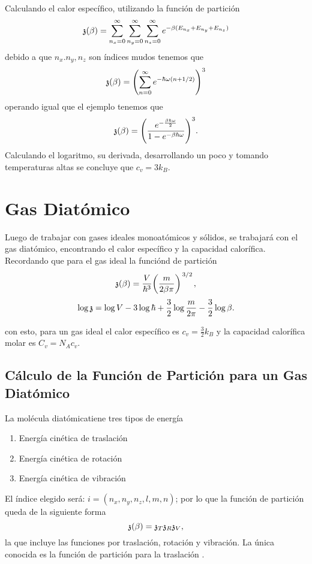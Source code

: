 Calculando el calor específico, utilizando la función de partición 
    $$ \mathfrak{z} (\beta) = \sum _{n_x = 0} ^\infty \sum _{n_y = 0} ^\infty \sum _{n_z = 0} ^\infty e^{-\beta (E_{n_x} + E_{n_y} + E_{n_z})} $$
debido a que $n_x. n_y, n_z$ son índices mudos tenemos que
    $$ \mathfrak{z} (\beta) = \qty(\sum _{n=0} ^\infty e^{-\hbar \omega (n + 1/2)})^3  $$
operando igual que el ejemplo tenemos que
    $$ \mathfrak{z} (\beta) = \qty(\frac{e^{-\frac{\beta \hbar \omega}{2}}}{1 - e^{-\beta \hbar \omega}})^3 . $$
Calculando el logaritmo, su derivada, desarrollando un poco y tomando temperaturas altas se concluye que $ c_v = 3k_B$.

\chapter{Gas Diatómico}
Luego de trabajar con gases ideales monoatómicos y sólidos, se trabajará con el gas diatómico, encontrando el calor específico y la capacidad calorífica. Recordando que para el gas ideal la funciónd de partición
	$$ \partition (\beta) = \frac{V}{\hbar ^3} \qty(\frac{m}{2\beta \pi})^{\flatfrac{3}{2}}, $$
	$$ \log{\mathfrak{z}} = \log{V} - 3\log{\hbar} + \frac{3}{2}\log{\frac{m}{2\pi} - \frac{3}{2} \log{\beta}}. $$

con esto, para un gas ideal el calor específico es $c_v = \frac{3}{2} k_B$ y la capacidad calorífica molar es $C_v = N_A c_v$.

\section{Cálculo de la Función de Partición para un Gas Diatómico}
La molécula diatómicatiene tres tipos de energía
\begin{enumerate}
	\item Energía cinética de traslación
	\item Energía cinética de rotación
	\item Energía cinética de vibración
\end{enumerate}

El índice elegido será: $i = (n_x,n_y,n_z,l,m,n)$; por lo que la función de partición queda de la siguiente forma
	$$ \mathfrak{z} (\beta) = \mathfrak{z} _T \mathfrak{z} _R \mathfrak{z} _V, $$
la que incluye las funciones por traslación, rotación y vibración. La única conocida es la función de partición para la traslación .

